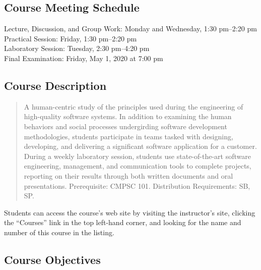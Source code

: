 \documentclass[11pt]{article}
\begin{document}
\subsection*{Course Meeting Schedule}

Lecture, Discussion, and Group Work: Monday and Wednesday, 1:30 pm--2:20 pm
\\[0.025in]
Practical Session: Friday, 1:30 pm--2:20 pm \\
[0.025in]
Laboratory Session: Tuesday, 2:30 pm--4:20 pm \\
[0.025in]
Final Examination: Friday, May 1, 2020 at 7:00 pm

\subsection*{Course Description}

\begin{quote}

A human-centric study of the principles used during the engineering of
high-quality software systems. In addition to examining the human behaviors and
social processes undergirding software development methodologies, students
participate in teams tasked with designing, developing, and delivering a
significant software application for a customer. During a weekly laboratory
session, students use state-of-the-art software engineering, management, and
communication tools to complete projects, reporting on their results through
both written documents and oral presentations. Prerequisite: CMPSC
101. Distribution Requirements: SB, SP.\@ \\

\end{quote}

\noindent Students can access the course's web site by visiting the instructor's
site, clicking the ``Courses'' link in the top left-hand corner, and looking for
the name and number of this course in the listing.

\subsection*{Course Objectives}
\end{document}
